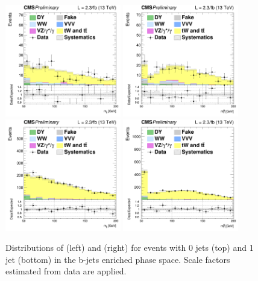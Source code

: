 \begin{figure}[htb]
\centering
\includegraphics[width=0.45\textwidth]{images/13TeV/cratio_hww2l2v_13TeV_top_of0j_mll.png}
\includegraphics[width=0.45\textwidth]{images/13TeV/cratio_hww2l2v_13TeV_top_of0j_mth.png}
\includegraphics[width=0.45\textwidth]{images/13TeV/cratio_hww2l2v_13TeV_top_of1j_mll.png}
\includegraphics[width=0.45\textwidth]{images/13TeV/cratio_hww2l2v_13TeV_top_of1j_mth.png}
\caption{
Distributions of \mll (left) and \mt (right) for events with 0 jets (top) and 1 jet (bottom) in the b-jets enriched phase space. Scale factors estimated from data are applied.%
}
\label{fig:TopCtrl125}
\end{figure}

